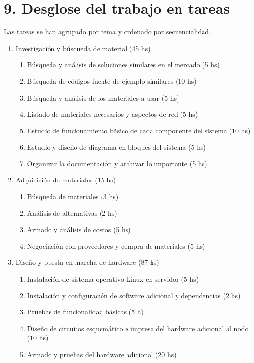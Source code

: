 \documentclass[
11pt, %
]{charter}
\begin{document}
\section{9. Desglose del trabajo en tareas}
\label{sec:wbs}

Las tareas se han agrupado por tema y ordenado por secuencialidad.

\begin{enumerate}
\item Investigación y búsqueda de material (45 hs)
	\begin{enumerate}
		\item Búsqueda y análisis de soluciones similares en el mercado (5 hs)
		\item Búsqueda de códigos fuente de ejemplo similares (10 hs)
		\item Búsqueda y análisis de los materiales a usar (5 hs)
		\item Listado de materiales necesarios y aspectos de red (5 hs)
		\item Estudio de funcionamiento básico de cada componente del sistema (10 hs)
		\item Estudio y diseño de diagrama en bloques del sistema (5 hs)
		\item Organizar la documentación y archivar lo importante (5 hs)
	\end{enumerate}
\item Adquisición de materiales (15 hs)
	\begin{enumerate}
		\item Búsqueda de materiales (3 hs)
		\item Análisis de alternativas (2 hs)
		\item Armado y análisis de costos (5 hs)
		\item Negociación con proveedores y compra de materiales (5 hs)
	\end{enumerate}
\item Diseño y puesta en marcha de hardware (87 hs)
	\begin{enumerate}
		\item Instalación de sistema operativo Linux en servidor (5 hs)
		\item Instalación y configuración de software adicional y dependencias (2 hs)
		\item Pruebas de funcionalidad básicas (5 h)
		\item Diseño de circuitos esquemático e impreso del hardware adicional al nodo (10 hs)
		\item Armado y pruebas del hardware adicional (20 hs)

\end{enumerate}
\end{enumerate}
\end{document}
